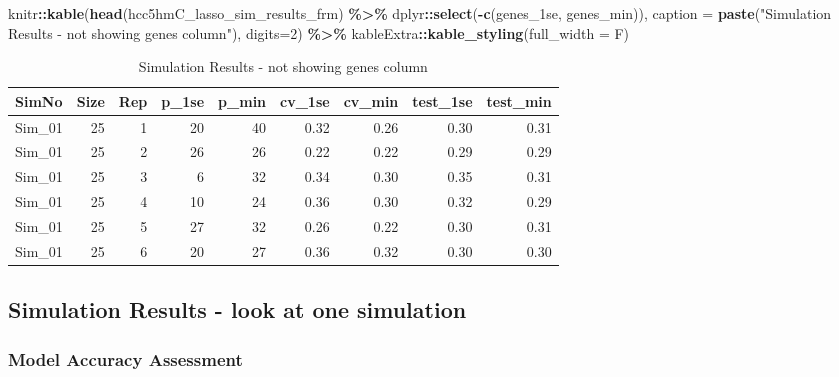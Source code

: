 \documentclass[
]{book}
\newenvironment{Shaded}{\begin{snugshade}}{\end{snugshade}}
\newcommand{\DataTypeTok}[1]{\textcolor[rgb]{0.13,0.29,0.53}{#1}}
\newcommand{\DecValTok}[1]{\textcolor[rgb]{0.00,0.00,0.81}{#1}}
\newcommand{\KeywordTok}[1]{\textcolor[rgb]{0.13,0.29,0.53}{\textbf{#1}}}
\newcommand{\NormalTok}[1]{#1}
\newcommand{\OperatorTok}[1]{\textcolor[rgb]{0.81,0.36,0.00}{\textbf{#1}}}
\newcommand{\StringTok}[1]{\textcolor[rgb]{0.31,0.60,0.02}{#1}}
\begin{document}
\begin{Shaded}
\begin{Highlighting}[]
\NormalTok{knitr}\OperatorTok{::}\KeywordTok{kable}\NormalTok{(}\KeywordTok{head}\NormalTok{(hcc5hmC\_lasso\_sim\_results\_frm) }\OperatorTok{\%>\%}\StringTok{ }\NormalTok{dplyr}\OperatorTok{::}\KeywordTok{select}\NormalTok{(}\OperatorTok{{-}}\KeywordTok{c}\NormalTok{(genes\_1se, genes\_min)),}
    \DataTypeTok{caption =} \KeywordTok{paste}\NormalTok{(}\StringTok{"Simulation Results {-} not showing genes column"}\NormalTok{),}
    \DataTypeTok{digits=}\DecValTok{2}\NormalTok{) }\OperatorTok{\%>\%}
\StringTok{   }\NormalTok{kableExtra}\OperatorTok{::}\KeywordTok{kable\_styling}\NormalTok{(}\DataTypeTok{full\_width =}\NormalTok{ F)}
\end{Highlighting}
\end{Shaded}

\begin{table}

\caption{\label{tab:hcc5hmC-glmnetSuite-sum-table}Simulation Results - not showing genes column}
\centering
\begin{tabular}[t]{l|r|r|r|r|r|r|r|r}
\hline
SimNo & Size & Rep & p\_1se & p\_min & cv\_1se & cv\_min & test\_1se & test\_min\\
\hline
Sim\_01 & 25 & 1 & 20 & 40 & 0.32 & 0.26 & 0.30 & 0.31\\
\hline
Sim\_01 & 25 & 2 & 26 & 26 & 0.22 & 0.22 & 0.29 & 0.29\\
\hline
Sim\_01 & 25 & 3 & 6 & 32 & 0.34 & 0.30 & 0.35 & 0.31\\
\hline
Sim\_01 & 25 & 4 & 10 & 24 & 0.36 & 0.30 & 0.32 & 0.29\\
\hline
Sim\_01 & 25 & 5 & 27 & 32 & 0.26 & 0.22 & 0.30 & 0.31\\
\hline
Sim\_01 & 25 & 6 & 20 & 27 & 0.36 & 0.32 & 0.30 & 0.30\\
\hline
\end{tabular}
\end{table}

\hypertarget{simulation-results---look-at-one-simulation}{%
\subsection{Simulation Results - look at one simulation}\label{simulation-results---look-at-one-simulation}}

\hypertarget{model-accuracy-assessment}{%
\subsubsection{Model Accuracy Assessment}\label{model-accuracy-assessment}}
\end{document}
